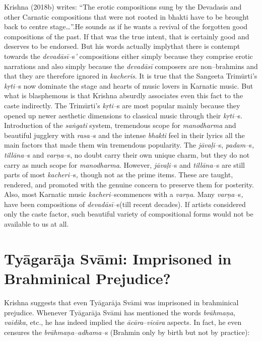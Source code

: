 Krishna (2018b) writes: “The erotic compositions sung by the Devadasis and other Carnatic compositions that were not rooted in bhakti have to be brought back to centre stage…”.He sounds as if he wants a revival of the forgotten good compositions of the past. If that was the true intent, that is certainly good and deserves to be endorsed. But his words actually implythat there is contempt towards the \textit{devadāsī–}s\textit{’} compositions either simply because they comprise erotic narrations and also simply because the \textit{devadāsī} composers are non–brahmins and that they are therefore ignored in \textit{kacheris}. It is true that the Sangeeta Trimūrti’s \textit{kṛti–}s now dominate the stage and hearts of music lovers in Karnatic music. But what is blasphemous is that Krishna absurdly associates even this fact to the caste indirectly. The Trimūrti’s \textit{kṛti–}s are most popular mainly because they opened up newer aesthetic dimensions to classical music through their \textit{kṛti–}s. Introduction of the \textit{saṅgati} system, tremendous scope for \textit{manodharma} and beautiful jugglery with \textit{rasa–}s and the intense \textit{bhakti} feel in their lyrics all the main factors that made them win tremendous popularity. The \textit{jāvaḷi–}s, \textit{padam–}s\textit{, tillāna–}s and \textit{varṇa–}s, no doubt carry their own unique charm, but they do not carry as much scope for \textit{manodharma}. However, \textit{jāvaḷi–}s and \textit{tillāna–}s are still parts of most \textit{kacheri–}s\textit{,} though not as the prime items. These are taught, rendered, and promoted with the genuine concern to preserve them for posterity. Also, most Karnatic music \textit{kacheri}–scommences with a \textit{varṇa}. Many \textit{varṇa–}s\textit{,} have been compositions of \textit{devadāsī–}s(till recent decades). If artists considered only the caste factor, such beautiful variety of compositional forms would not be available to us at all.

\vspace{-.3cm}

\section*{Tyāgarāja Svāmi: Imprisoned in Brahminical Prejudice?}

Krishna suggests that even Tyāgarāja Svāmi was imprisoned in brahminical prejudice.  Whenever Tyāgarāja Svāmi has mentioned the words \textit{brāhmaṇa}, \textit{vaidika}, etc., he has indeed implied the \textit{ācāra}–\textit{vicāra} aspects. In fact, he even censures the \textit{brāhmaṇa–adhama–}s (Brahmin only by birth but not by practice):

